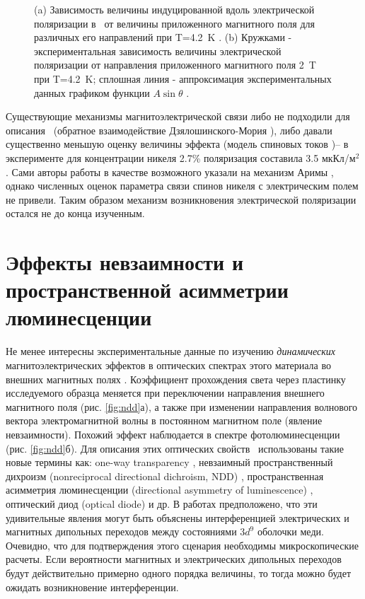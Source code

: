 \begin{figure}[ht]
	\caption{(a) Зависимость величины индуцированной вдоль  электрической поляризации в \ncbo\ от величины приложенного магнитного поля для различных его направлений при T=\SI{4.2}{\kelvin} \cite{Nenert2007}. (b) Кружками - экспериментальная зависимость величины электрической поляризации от направления приложенного магнитного поля \SI{2}{\tesla} при T=\SI{4.2}{\kelvin}; сплошная линия - аппроксимация экспериментальных данных графиком функции $A\sin\theta$ \cite{Nenert2007}.}
	\label{fig:khan}
\end{figure} 

Существующие механизмы магнитоэлектрической связи либо не подходили для описания \cbo\ (обратное взаимодействие Дзялошинского-Мория \cite{Sergienko2006}), либо давали существенно меньшую оценку величины эффекта (модель спиновых токов \cite{Katsura2005})– в эксперименте для концентрации никеля 2.7\% поляризация составила 3.5 мкКл/м\(^2\). Сами авторы работы \cite{Khanh2013} в качестве возможного указали на механизм Аримы \cite{Arima2007}, однако численных оценок параметра связи спинов никеля с электрическим полем не привели. Таким образом механизм возникновения электрической поляризации остался не до конца изученным.

\section{Эффекты невзаимности и пространственной асимметрии люминесценции}\label{sec:ch1/sec3}

Не менее интересны экспериментальные данные по изучению \emph{динамических} магнитоэлектрических эффектов в оптических спектрах этого материала во внешних магнитных полях \cite{Saito2008prl, Saito2008jpsj, Lovesey2009, Toyoda2015, Boldyrev2015}. Коэффициент прохождения света через пластинку исследуемого образца меняется при переключении направления внешнего магнитного поля (рис. \cref{fig:ndd}а), а также при изменении направления волнового вектора электромагнитной волны в постоянном магнитном поле (явление невзаимности). Похожий эффект наблюдается в спектре фотолюминесценции (рис. \cref{fig:ndd}б). Для описания этих оптических свойств \cbo\ использованы такие новые термины как: one-way transparency \cite{Toyoda2015}, невзаимный пространственный дихроизм (nonreciprocal directional dichroism, NDD) \cite{Toyoda2015}, пространственная асимметрия люминесценции (directional asymmetry of luminescence) \cite{Toyoda2016}, оптический диод (optical diode) и др. В работах \cite{Toyoda2015, Toyoda2016} предположено, что эти удивительные явления могут быть объяснены интерференцией электрических и магнитных дипольных переходов между состояниями \(3d^9\) оболочки меди. Очевидно, что для подтверждения этого сценария необходимы микроскопические расчеты. Если вероятности магнитных и электрических дипольных переходов будут действительно примерно одного порядка величины, то тогда можно будет ожидать возникновение интерференции.


